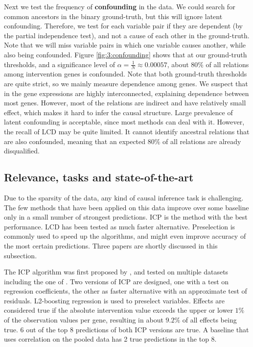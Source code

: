 Next we test the frequency of \textbf{confounding} in the data. We could search for common ancestors in the binary ground-truth, but this will ignore latent confounding. Therefore, we test for each variable pair if they are dependent (by the partial independence test), and not a cause of each other in the ground-truth. Note that we will miss variable pairs in which one variable causes another, while also being confounded. Figure \ref{fig:3:confounding} shows that at our ground-truth thresholds, and a significance level of $\alpha = \frac{1}{N} \approx 0.00057$, about $80\%$ of all relations among intervention genes is confounded. Note that both ground-truth thresholds are quite strict, so we mainly measure dependence among genes. We suspect that in the gene expressions are highly interconnected, explaining dependence between most genes. However, most of the relations are indirect and have relatively small effect, which makes it hard to infer the causal structure. Large prevalence of latent confounding is acceptable, since most methods can deal with it. However, the recall of LCD may be quite limited. It cannot identify ancestral relations that are also confounded, meaning that an expected $80\%$ of all relations are already disqualified.


\subsection{Relevance, tasks and state-of-the-art}

Due to the sparsity of the data, any kind of causal inference task is challenging. The few methods that have been applied on this data improve over some baseline only in a small number of strongest predictions. ICP is the method with the best performance. LCD has been tested as much faster alternative. Preselection is commonly used to speed up the algorithms, and might even improve accuracy of the most certain predictions. Three papers are shortly discussed in this subsection.

The ICP algorithm was first proposed by \textbf{\citet{peters2016causal}}, and tested on multiple datasets including the one of \citet{kemmeren2014large}. Two versions of ICP are designed, one with a test on regression coefficients, the other as faster alternative with an approximate test of residuals. L2-boosting regression \citep{schapire1998boosting} is used to preselect variables. Effects are considered true if the absolute intervention value exceeds the upper or lower $1\%$ of the observation values per gene, resulting in about $9.2\%$ of all effects being true. 6 out of the top 8 predictions of both ICP versions are true. A baseline that uses correlation on the pooled data has 2 true predictions in the top 8.

